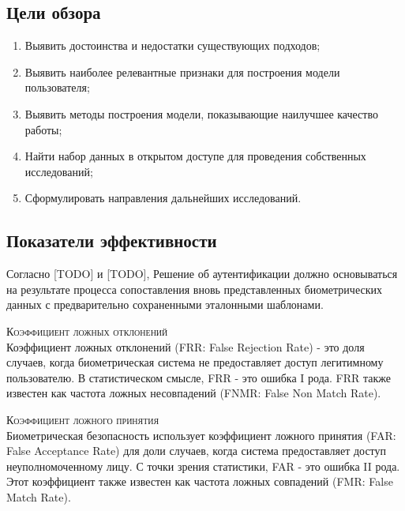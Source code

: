\documentclass[12pt]{article}
\begin{document}
    \subsection{Цели обзора}
    \label{sec:Overview:Goals}

    \begin{enumerate}
        \item Выявить достоинства и недостатки существующих подходов;
        \item Выявить наиболее релевантные признаки для построения модели пользователя;
        \item Выявить методы построения модели, показывающие наилучшее качество работы;
        \item Найти набор данных в открытом доступе для проведения собственных исследований;
        \item Сформулировать направления дальнейших исследований.
    \end{enumerate}

    \newpage


    \subsection{Показатели эффективности}
    \label{sec:Overview:Metrics}

    \par Согласно [TODO] и [TODO], Решение об аутентификации должно основываться на результате процесса сопоставления вновь представленных биометрических данных с предварительно сохраненными эталонными шаблонами. \\

    \par \textsc{Коэффициент ложных отклонений} \\
    \noindent Коэффициент ложных отклонений (FRR: False Rejection Rate) - это доля случаев, когда биометрическая система не предоставляет доступ легитимному пользователю. В статистическом смысле, FRR - это ошибка I рода. FRR также известен как частота ложных несовпадений (FNMR: False Non Match Rate). \\

    \par \textsc{Коэффициент ложного принятия} \\
    \noindent Биометрическая безопасность использует коэффициент ложного принятия (FAR: False Acceptance Rate) для доли случаев, когда система предоставляет доступ неуполномоченному лицу. С точки зрения статистики, FAR - это ошибка II рода. Этот коэффициент также известен как частота ложных совпадений (FMR: False Match Rate). \\
\end{document}
